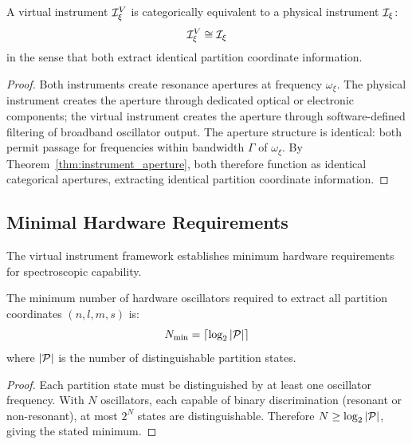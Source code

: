 \begin{theorem}
\label{thm:virtual_equivalence}
A virtual instrument $\mathcal{I}^V_\xi$ is categorically equivalent to a physical instrument $\mathcal{I}_\xi$:
\begin{equation}
\mathcal{I}^V_\xi \cong \mathcal{I}_\xi
\end{equation}
in the sense that both extract identical partition coordinate information.
\end{theorem}

\begin{proof}
Both instruments create resonance apertures at frequency $\omega_\xi$. The physical instrument creates the aperture through dedicated optical or electronic components; the virtual instrument creates the aperture through software-defined filtering of broadband oscillator output. The aperture structure is identical: both permit passage for frequencies within bandwidth $\Gamma$ of $\omega_\xi$. By Theorem~\ref{thm:instrument_aperture}, both therefore function as identical categorical apertures, extracting identical partition coordinate information.
\end{proof}

\subsection{Minimal Hardware Requirements}

The virtual instrument framework establishes minimum hardware requirements for spectroscopic capability.

\begin{theorem}
\label{thm:min_oscillators}
The minimum number of hardware oscillators required to extract all partition coordinates $(n, l, m, s)$ is:
\begin{equation}
N_{\mathrm{min}} = \lceil \log_2 |\mathcal{P}| \rceil
\end{equation}
where $|\mathcal{P}|$ is the number of distinguishable partition states.
\end{theorem}

\begin{proof}
Each partition state must be distinguished by at least one oscillator frequency. With $N$ oscillators, each capable of binary discrimination (resonant or non-resonant), at most $2^N$ states are distinguishable. Therefore $N \geq \log_2 |\mathcal{P}|$, giving the stated minimum.
\end{proof}

